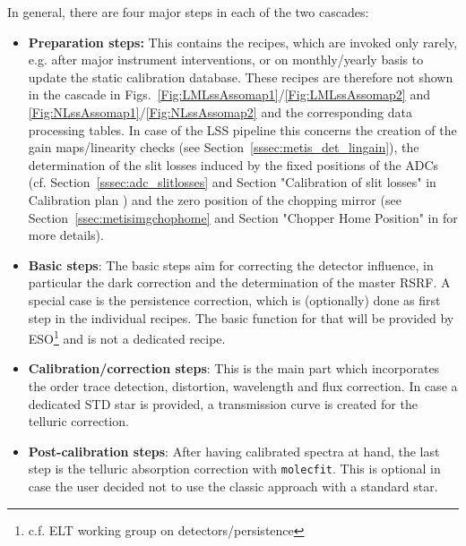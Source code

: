 In general, there are four major steps in each of the two cascades:
\begin{itemize}
    \item \textbf{Preparation steps:} This contains the recipes, which are invoked only rarely, e.g. after major instrument interventions, or on monthly/yearly basis to update the static calibration database. These recipes are therefore not shown in the cascade in Figs.~\ref{Fig:LMLssAssomap1}/\ref{Fig:LMLssAssomap2} and \ref{Fig:NLssAssomap1}/\ref{Fig:NLssAssomap2} and the corresponding data processing tables. In case of the \ac{LSS} pipeline this concerns the creation of the gain maps/linearity checks (see Section~\ref{sssec:metis_det_lingain}), the determination of the slit losses induced by the fixed positions of the ADCs (cf. Section~\ref{sssec:adc_slitlosses} and Section "Calibration of slit losses" in Calibration plan \cite{METIS-calibration_plan}) and the zero position of the chopping mirror (see Section~\ref{ssec:metisimgchophome} and Section "Chopper Home Position" in \cite{METIS-calibration_plan} for more details). 
    \item \textbf{Basic steps}: The basic steps aim for correcting the detector influence, in particular the dark correction and the determination of the master \ac{RSRF}. A special case is the persistence correction, which is (optionally) done as first step in the individual recipes. The basic function for that will be provided by \ac{ESO}\footnote{c.f. \ac{ELT} working group on detectors/persistence} and is not a dedicated recipe. 
    \item \textbf{Calibration/correction steps}: This is the main part which incorporates the order trace detection, distortion, wavelength and flux correction. In case a dedicated \ac{STD} star is provided, a transmission curve is created for the telluric correction.
    \item \textbf{Post-calibration steps}: After having calibrated spectra at hand, the last step is the telluric absorption correction with \texttt{molecfit}. This is optional in case the user decided not to use the classic approach with a standard star.
\end{itemize}

